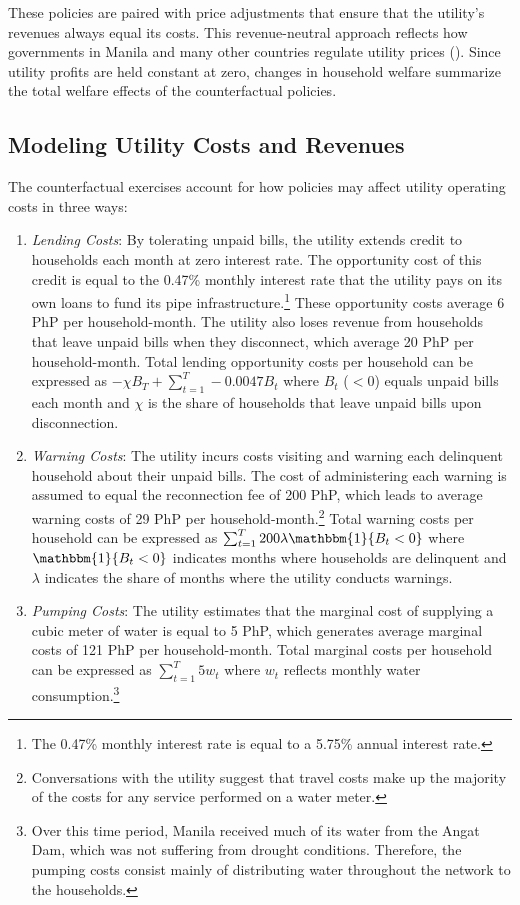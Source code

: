 \documentclass[12pt]{article}
\begin{document}
These policies are paired with price adjustments that ensure that the utility's revenues always equal its costs.  This revenue-neutral approach reflects how governments in Manila and many other countries regulate utility prices (\cite{hoque2013state}).  Since utility profits are held constant at zero, changes in household welfare summarize the total welfare effects of the counterfactual policies.  

\subsection{Modeling Utility Costs and Revenues}\label{section:costmodel}

The counterfactual exercises account for how policies may affect utility operating costs in three ways:
\begin{enumerate}
	\item \textit{Lending Costs}:  By tolerating unpaid bills, the utility extends credit to households each month at zero interest rate.  The opportunity cost of this credit is equal to the 0.47\% monthly interest rate that the utility pays on its own loans to fund its pipe infrastructure.\footnote{The 0.47\% monthly interest rate is equal to a 5.75\% annual interest rate.}  These opportunity costs average 6 PhP per household-month.  The utility also loses revenue from households that leave unpaid bills when they disconnect, which average 20 PhP per household-month.  Total lending opportunity costs per household can be expressed as $ - \chi B_T + \sum_{t=1}^{T}  - 0.0047 B_t $ where $B_t$ ($<0$) equals unpaid bills each month and $\chi$ is the share of households that leave unpaid bills upon disconnection.

	\item \textit{Warning Costs}:  The utility incurs costs visiting and warning each delinquent household about their unpaid bills.  The cost of administering each warning is assumed to equal the reconnection fee of 200 PhP, which leads to average warning costs of 29 PhP per household-month.\footnote{Conversations with the utility suggest that travel costs make up the majority of the costs for any service performed on a water meter.}  Total warning costs per household can be expressed as  $\sum_{t=1}^{T} 200 \lambda \mathbbm{1}\{B_t < 0 \}  $ where $ \mathbbm{1}\{B_t < 0 \}$ indicates months where households are delinquent and $\lambda$ indicates the share of months where the utility conducts warnings.

	\item \textit{Pumping Costs}: The utility estimates that the marginal cost of supplying a cubic meter of water is equal to 5 PhP, which generates average marginal costs of 121 PhP per household-month.  Total marginal costs per household can be expressed as $\sum_{t=1}^{T} 5 w_t  $ where $w_t$ reflects monthly water consumption.\footnote{Over this time period, Manila received much of its water from the Angat Dam, which was not suffering from drought conditions.  Therefore, the pumping costs consist mainly of distributing water throughout the network to the households.}
\end{enumerate}
\end{document}
